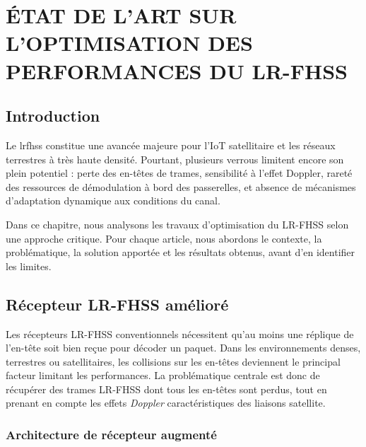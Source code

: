 \chapter{ÉTAT DE L'ART SUR L'OPTIMISATION DES PERFORMANCES DU LR-FHSS}
\label{chap3}

\section{Introduction}
Le \gls{lrfhss} constitue une avancée majeure pour l'IoT satellitaire et les réseaux terrestres à très haute densité. Pourtant, plusieurs verrous limitent encore son plein potentiel : perte des en-têtes de trames, sensibilité à l'effet Doppler, rareté des ressources de démodulation à bord des passerelles, et absence de mécanismes d'adaptation dynamique aux conditions du canal.

Dans ce chapitre, nous analysons les travaux d'optimisation du LR-FHSS selon une approche critique. Pour chaque article, nous abordons le contexte, la problématique, la solution apportée et les résultats obtenus, avant d'en identifier les limites.


\section{Récepteur LR-FHSS amélioré}

Les récepteurs LR-FHSS conventionnels nécessitent qu'au moins une réplique de l'en-tête soit bien reçue pour décoder un paquet. Dans les environnements denses, terrestres ou satellitaires, les collisions sur les en-têtes deviennent le principal facteur limitant les performances. La problématique centrale est donc de récupérer des trames LR-FHSS dont tous les en-têtes sont perdus, tout en prenant en compte les effets \textit{Doppler} caractéristiques des liaisons satellite.

\subsection{Architecture de récepteur augmenté}

